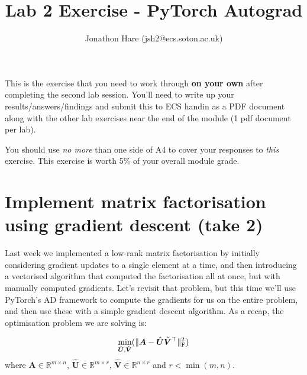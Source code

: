 \documentclass[a4paper]{article}
\begin{document}
\lstset{language=Python,upquote=true}

\setlength{\leftskip}{20pt}
\title{Lab 2 Exercise - PyTorch Autograd}
\author{Jonathon Hare (jsh2@ecs.soton.ac.uk)}

\maketitle


This is the exercise that you need to work through \textbf{on your own} after completing the second lab session. You'll need to write up your results/answers/findings and submit this to ECS handin as a PDF document along with the other lab exercises near the end of the module (1 pdf document per lab). 

You should use \emph{no more} than one side of A4 to cover your responses to \emph{this} exercise. This exercise is worth 5\% of your overall module grade.

\section{Implement matrix factorisation using gradient descent (take 2)}\label{gd}

Last week we implemented a low-rank matrix factorisation by initially considering gradient updates to a single element at a time, and then introducing a vectorised algorithm that computed the factorisation all at once, but with manually computed gradients. Let's revisit that problem, but this time we'll use PyTorch's AD framework to compute the gradients for us on the entire problem, and then use these with a simple gradient descent algorithm. As a recap, the optimisation problem we are solving is:

\begin{equation}
	\min\limits_{\hat{\bm U}, \hat{\bm V}}( \| \bm A - \hat{\bm U}\hat{\bm V}^\top \|_{\rm F}^2 )
\end{equation}
where $\bm A \in \mathbb{R}^{m \times n}$, $\hat{\bm U} \in \mathbb{R}^{m \times r}$, $\hat{\bm V} \in \mathbb{R}^{n \times r}$ and $r<\min(m,n)$. 
\end{document}
